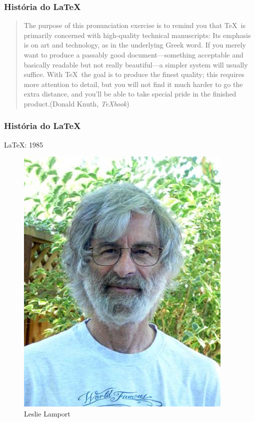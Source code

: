 \begin{frame}
  \frametitle{História do LaTeX}
  \LARGE
\end{frame}

\begin{frame}
  \large
  \begin{quote}
    The purpose of this pronunciation exercise is to remind you that \TeX\ is
    primarily concerned with high-quality technical manuscripts: Its emphasis
    is on art and technology, as in the underlying Greek word. If you merely
    want to produce a passably good document—something acceptable and basically
    readable but not really beautiful—a simpler system will usually suffice.
    With \TeX\ the goal is to produce the finest quality; this requires more
    attention to detail, but you will not find it much harder to go the extra
    distance, and you’ll be able to take special pride in the finished
    product.\hfill (Donald Knuth, \emph{\TeX book})
  \end{quote}
\end{frame}

\begin{frame}
  \frametitle{História do LaTeX}
  \LARGE
  \LaTeX: 1985
\end{frame}

\begin{frame}[plain]
  \begin{figure}[h]
    \includegraphics[scale=.5]{imagens/lamport}
    \caption{Leslie Lamport}
  \end{figure}
\end{frame}
